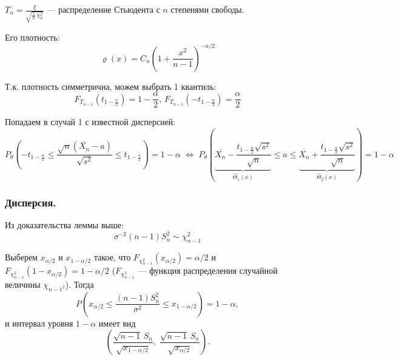 \begin{enumerate}
	$T_{n} = \frac{\xi}{\sqrt{\frac1n\,\chi_n^2}}$ --- распределение Стьюдента с $n$ степенями свободы.
	
	Его плотность:
	\[ \varrho(x) = C_n \left( 1 + \frac{x^2}{n-1} \right)^{-n/2} \]
 	
	Т.к. плотность симметрична, можем выбрать 1 квантиль:
	\[ F_{T_{n-1}}(t_{1 - \frac{\alpha}2}) = 1 - \frac{\alpha}2, \, F_{T_{n-1}}(-t_{1 - \frac{\alpha}2}) = \frac{\alpha}2 \]
	
	Попадаем в случай 1 с известной дисперсией:
	\[ P_{\theta} \left( -t_{1 - \frac{\alpha}2} \le \frac{\sqrt{n}(\overline{X_n} - a)}{\sqrt{s^2}} \le t_{1 - \frac{\alpha}2} \right) = 
	1 - \alpha \;\Leftrightarrow\; 
	P_{\theta} \left( \underset{\hat\Theta_1(x)}{\underbrace{\overline{X_n} - \frac{t_{1 - \frac{\alpha}2} \sqrt{s^2}}{\sqrt{n}}}} \le a \le 
	\underset{\hat\Theta_2(x)}{\underbrace{\overline{X_n} + \frac{t_{1 - \frac{\alpha}2} \sqrt{s^2}}{\sqrt{n}}}} \right) = 1 - \alpha \]
\end{enumerate}

\subsubsection{Дисперсия.}

Из доказательства леммы выше:
\[ \sigma^{-2}(n - 1) S_n^2 \sim \chi_{n-1}^2 \]

Выберем $x_{\alpha/2}$ и $x_{1-\alpha/2}$ такое, что $F_{\chi_{n-1}^2}(x_{\alpha/2}) = \alpha/2$ и $F_{\chi_{n-1}^2}(1-x_{\alpha/2}) = 1-\alpha/2$ ($F_{\chi_{n-1}^2}$ --- функция распределения случайной величины $\chi_{n-1^2}$). Тогда
\[ P \left( x_{\alpha/2} \le \frac{(n-1) S_n^2}{\sigma^2} \le x_{1-\alpha/2} \right) = 1 - \alpha, \]
и интервал уровня $1 - \alpha$ имеет вид 
\[ \left( \frac{\sqrt{n-1}\,S_n}{\sqrt{x_{1-\alpha/2}}}, \; \frac{\sqrt{n-1}\,S_n}{\sqrt{x_{\alpha/2}}} \right). \] 
